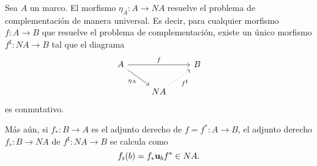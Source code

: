 \begin{theorem}
  Sea $A$ un marco.
  El morfismo $\eta_A:A\to NA$ resuelve el problema de
  complementación de manera universal.
  Es decir, para cualquier morfismo $f:A\to B$ que resuelve el
  problema de complementación, existe un único morfismo
  $f^\sharp:NA\to B$ tal que el diagrama
  \[
    \begin{tikzcd}
      A \ar[dr,"\eta_A"'] \ar[rr,"f"] && B \\
      & NA \ar[ur,"f^\sharp"',dotted]
    \end{tikzcd}
  \]
  es conmutativo.

  Más aún, si $f_*:B\to A$ es el adjunto derecho de $f=f^*:A\to
  B$, el adjunto derecho $f_\flat:B\to NA$ de $f^\sharp:NA\to B$
  se calcula como
  \[
    f_\flat(b) = f_*\mathbf u_{b} f^* \in NA
  .\]
\end{theorem}
